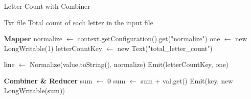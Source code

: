 \begin{algorithm}[H]
    \caption{Letter Count with Combiner}
    \begin{algorithmic}[1]
        \Require Txt file
        \Ensure Total count of each letter in the input file
        
        \vspace{1em}

        \Statex
        \noindent \textbf{Mapper}
        \State normalize $\leftarrow$ context.getConfiguration().get("normalize")
        \State one $\leftarrow$ new LongWritable(1)
        \State letterCountKey $\leftarrow$ new Text("total\_letter\_count") 
        \EndProcedure

        \vspace{1em}

        \State line $\leftarrow$ Normalize(value.toString(), normalize) 
        \State Emit(letterCountKey, one)
        \EndFor
        \EndProcedure

        \vspace{1em}

        \Statex
        \noindent \textbf{Combiner \& Reducer}
        \State sum $\leftarrow$ 0
        \State sum $\leftarrow$ sum + val.get()
        \EndFor
        \State Emit(key, new LongWritable(sum))
        \EndProcedure
    \end{algorithmic}
\end{algorithm}



